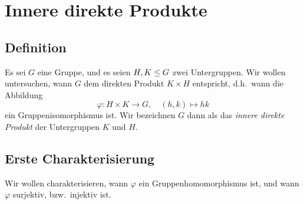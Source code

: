 \chapter{Innere direkte Produkte}





\section{Definition}

Es sei $G$ eine Gruppe, und es seien $H, K \leq G$ zwei Untergruppen.
Wir wollen untersuchen, wann $G$ dem direkten Produkt $K \times H$ entspricht, d.h.\ wann die Abbildung
\[
          \varphi
  \colon  H \times K
  \to     G,
  \quad   (h,k)
  \mapsto hk
\]
ein Gruppenisomorphismus ist.
Wir bezeichnen $G$ dann als das \emph{innere direkte Produkt} der Untergruppen $K$ und $H$.





\section{Erste Charakterisierung}

Wir wollen charakterisieren, wann $\varphi$ ein Gruppenhomomorphismus ist, und wann $\varphi$ surjektiv, bzw.\ injektiv ist.

